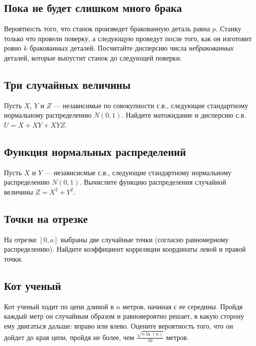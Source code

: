 \documentclass[12pt]{article}
\begin{document}
\subsection{Пока не будет слишком много брака}

Вероятность того, что станок произведет бракованную деталь равна $p$. Станку только что провели поверку, а следующую проведут после того, как он изготовит ровно $k$ бракованных деталей. Посчитайте дисперсию числа \emph{небракованных} деталей, которые выпустит станок до следующей поверки.



\subsection{Три случайных величины}

Пусть $X$, $Y$ и $Z$ --- независимые по совокупности с.в., следующие стандартному нормальному распределению $N(0, 1)$. Найдите матожидание и дисперсию с.в. $U = X + XY + XYZ$. 



\subsection{Функция нормальных распределений}

Пусть $X$ и $Y$ --- независисмые с.в., следующие стандартному нормальному распределению $N(0, 1)$. Вычислите функцию распределения случайной величины $Z = X^2 + Y^2$.



\subsection{Точки на отрезке}

На отрезке $[0, a]$ выбраны две случайные точки (согласно равномерному распределению). Найдите коэффициент корреляции координаты левой и правой точки. 



\subsection{Кот ученый}

Кот ученый ходит по цепи длиной в $n$ метров, начиная с ее середины. Пройдя каждый метр он случайным образом и равновероятно решает, в какую сторону ему двигаться дальше: вправо или влево. Оцените вероятность того, что он дойдет до края цепи, пройдя не более, чем $\frac{\sqrt{n \ln(n)}}{16}$ метров.
\end{document}
